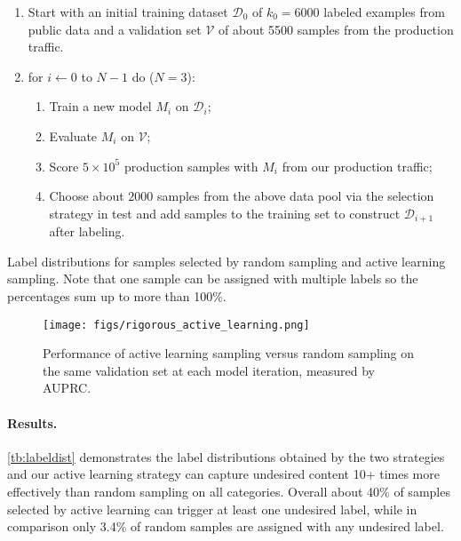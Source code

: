 \documentclass[letterpaper]{article} %
\begin{document}
\begin{enumerate}
    \item Start with an initial training dataset $\mathcal{D}_0$ of $k_0=6000$ labeled examples from public data and a validation set $\mathcal{V}$ of about 5500 samples from the production traffic.
    \item for $i \gets 0$ to $N-1$ do ($N=3$):
    \begin{enumerate}
        \item Train a new model $M_i$ on $\mathcal{D}_i$;
        \item Evaluate $M_i$ on $\mathcal{V}$;
        \item Score $5 \times 10^5$ production samples with $M_i$ from our production traffic;
        \item Choose about $2000$ samples from the above data pool via the selection strategy in test and add samples to the training set to construct $\mathcal{D}_{i+1}$ after labeling.
    \end{enumerate}
\end{enumerate}


\begin{table}
 \centering
 
 \caption{Label distributions for samples selected by random sampling and active learning sampling. Note that one sample can be assigned with multiple labels so the percentages sum up to more than 100\%.}
 \label{tb:labeldist}
\end{table}

\begin{figure}[t!]
\texttt{[image: figs/rigorous\_active\_learning.png]}
\caption{Performance of active learning sampling versus random sampling on the same validation set at each model iteration, measured by AUPRC.}
\label{fig:active_learning_exp2}
\end{figure}

\paragraph{Results.} 
\cref{tb:labeldist} demonstrates the label distributions obtained by the two strategies and our active learning strategy can capture undesired content 10+ times more effectively than random sampling on all categories. Overall about 40\% of samples selected by active learning can trigger at least one undesired label, while in comparison only 3.4\% of random samples are assigned with any undesired label.
\end{document}
